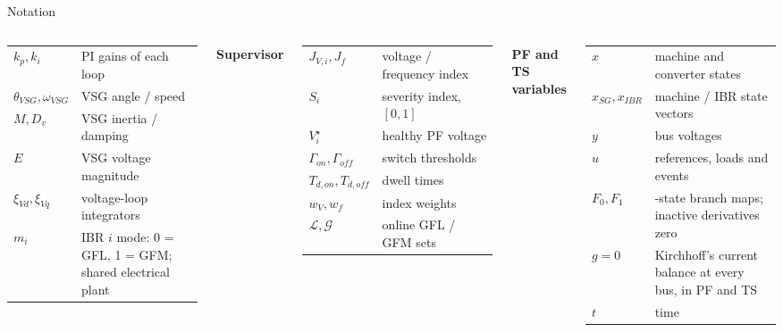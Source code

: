 \documentclass{beamer}
\begin{document}
\begin{frame}{Notation}
\begin{columns}[t,onlytextwidth]
\begin{tabular}{@{}p{1.65cm}>{\raggedright\arraybackslash}p{3.25cm}@{}}
$k_{p},k_{i}$ & PI gains of each loop\\
$\theta_{VSG},\omega_{VSG}$ & VSG angle / speed\\
$M,D_v$ & VSG inertia / damping\\
$E$ & VSG voltage magnitude\\
$\xi_{Vd},\xi_{Vq}$ & voltage-loop integrators\\
$m_i$ & IBR $i$ mode: 0 = GFL, 1 = GFM; shared electrical plant\\
\end{tabular}\par\medskip
\textbf{Supervisor}\par\smallskip
\begin{tabular}{@{}p{1.65cm}>{\raggedright\arraybackslash}p{3.25cm}@{}}
$J_{V,i},J_f$ & voltage / frequency index\\
$S_i$ & severity index, $[0,1]$\\
$V_i^\star$ & healthy PF voltage\\
$\Gamma_{on},\Gamma_{off}$ & switch thresholds\\
$T_{d,on},T_{d,off}$ & dwell times\\
$w_V,w_f$ & index weights\\
$\mathcal L,\mathcal G$ & online GFL / GFM sets\\
\end{tabular}
\par\medskip
\noindent\textbf{PF and TS variables}\par\smallskip
\noindent
\begin{tabular}{@{}p{1.65cm}>{\raggedright\arraybackslash}p{3.25cm}@{}}
$x$ & machine and converter states\\
$x_{SG},x_{IBR}$ & machine / IBR state vectors\\
$y$ & bus voltages\\
$u$ & references, loads and events\\
$F_0,F_1$ & 17-state branch maps; inactive derivatives zero\\
$g=0$ & Kirchhoff's current balance at every bus, in PF and TS\\
$t$ & time\\
\end{tabular}
\end{columns}
\end{frame}
\end{document}
